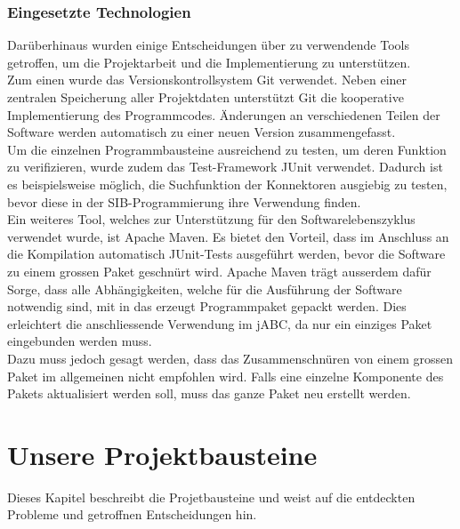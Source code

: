 \subsubsection{Eingesetzte Technologien}
Darüberhinaus wurden einige Entscheidungen über zu verwendende Tools getroffen, um die Projektarbeit und die Implementierung zu unterstützen.\\

Zum einen wurde das Versionskontrollsystem Git verwendet. Neben einer zentralen Speicherung aller Projektdaten unterstützt Git die kooperative Implementierung des Programmcodes. Änderungen an verschiedenen Teilen der Software werden automatisch zu einer neuen Version zusammengefasst.\\

Um die einzelnen Programmbausteine ausreichend zu testen, um deren Funktion zu verifizieren, wurde zudem das Test-Framework JUnit verwendet. Dadurch ist es beispielsweise möglich, die Suchfunktion der Konnektoren ausgiebig zu testen, bevor diese in der SIB-Programmierung ihre Verwendung finden.\\

Ein weiteres Tool, welches zur Unterstützung für den Softwarelebenszyklus verwendet wurde, ist Apache Maven. Es bietet den Vorteil, dass im Anschluss an die Kompilation automatisch JUnit-Tests ausgeführt werden, bevor die Software zu einem grossen Paket geschnürt wird. Apache Maven trägt ausserdem dafür Sorge, dass alle Abhängigkeiten, welche für die Ausführung der Software notwendig sind, mit in das erzeugt Programmpaket gepackt werden. Dies erleichtert die anschliessende Verwendung im jABC, da nur ein einziges Paket eingebunden werden muss.\\

Dazu muss jedoch gesagt werden, dass das Zusammenschnüren von einem grossen Paket im allgemeinen nicht empfohlen wird. Falls eine einzelne Komponente des Pakets aktualisiert werden soll, muss das ganze Paket neu erstellt werden. 

\section{Unsere Projektbausteine}
Dieses Kapitel beschreibt die Projetbausteine und weist auf die entdeckten Probleme und getroffnen Entscheidungen hin.
